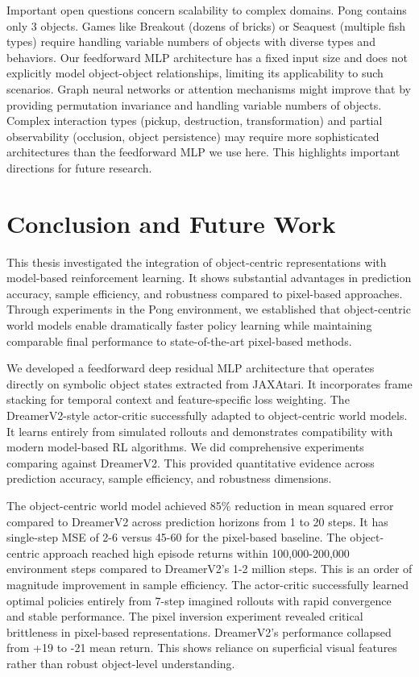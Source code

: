\documentclass[
	english,
	ruledheaders=section,
	class=report,
	thesis={type=master},
	accentcolor=9c,
	custommargins=true,
	marginpar=false,
	parskip=half-,
	fontsize=11pt,
	pdfa=true,
]{tudapub}
\newcommand{\worldmodel}{world model}
\begin{document}
Important open questions concern scalability to complex domains. Pong contains
only 3 objects. Games like Breakout (dozens of bricks) or Seaquest (multiple
fish types) require handling variable numbers of objects with diverse types and
behaviors. Our feedforward MLP architecture has a fixed input size and does not
explicitly model object-object relationships, limiting its applicability to such
scenarios. Graph neural networks or attention mechanisms
\cite{carion2020end,DBLP:conf/nips/LocatelloWUMHUD20} might improve that by providing
permutation invariance and handling variable numbers of objects.
Complex interaction types (pickup, destruction, transformation) and 
partial observability (occlusion, object persistence) may require more sophisticated architectures than the
feedforward MLP we use here. This highlights important directions for future
research.

\chapter{Conclusion and Future Work}
\label{chap:conclusion}

This thesis investigated the integration of object-centric representations with
model-based reinforcement learning. It shows substantial advantages in
prediction accuracy, sample efficiency, and robustness compared to pixel-based
approaches. Through experiments in the Pong environment, we established that
object-centric \worldmodel{}s enable dramatically faster policy learning while
maintaining comparable final performance to state-of-the-art pixel-based
methods.

We developed a feedforward deep residual MLP architecture that operates
directly on symbolic object states extracted from JAXAtari. It incorporates
frame stacking for temporal context and feature-specific loss weighting. The
DreamerV2-style actor-critic successfully adapted to object-centric
\worldmodel{}s. It learns entirely from simulated rollouts and demonstrates
compatibility with modern model-based RL algorithms. We did comprehensive
experiments comparing against DreamerV2. This provided quantitative evidence
across prediction accuracy, sample efficiency, and robustness dimensions.

The object-centric \worldmodel{} achieved 85\% reduction in mean squared error
compared to DreamerV2 across prediction horizons from 1 to 20 steps. It has
single-step MSE of 2-6 versus 45-60 for the pixel-based baseline. The
object-centric approach reached high episode returns within 100,000-200,000
environment steps compared to DreamerV2's 1-2 million steps. This is an order
of magnitude improvement in sample efficiency. The actor-critic successfully
learned optimal policies entirely from 7-step imagined rollouts with rapid
convergence and stable performance. The pixel inversion experiment revealed
critical brittleness in pixel-based representations. DreamerV2's performance
collapsed from +19 to -21 mean return. This shows reliance on superficial
visual features rather than robust object-level understanding.
\end{document}
